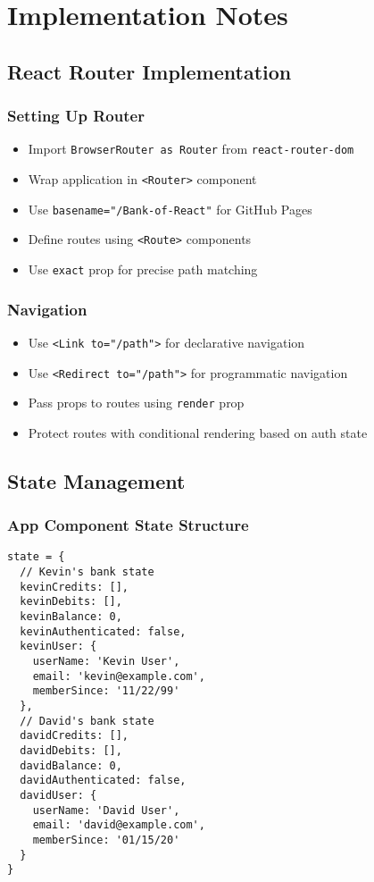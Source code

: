 \documentclass[11pt,a4paper]{article}
\begin{document}
\section{Implementation Notes}

\subsection{React Router Implementation}

\subsubsection{Setting Up Router}
\begin{itemize}[leftmargin=*]
    \item Import \texttt{BrowserRouter as Router} from \texttt{react-router-dom}
    \item Wrap application in \texttt{<Router>} component
    \item Use \texttt{basename="/Bank-of-React"} for GitHub Pages
    \item Define routes using \texttt{<Route>} components
    \item Use \texttt{exact} prop for precise path matching
\end{itemize}

\subsubsection{Navigation}
\begin{itemize}[leftmargin=*]
    \item Use \texttt{<Link to="/path">} for declarative navigation
    \item Use \texttt{<Redirect to="/path">} for programmatic navigation
    \item Pass props to routes using \texttt{render} prop
    \item Protect routes with conditional rendering based on auth state
\end{itemize}

\subsection{State Management}

\subsubsection{App Component State Structure}
\begin{verbatim}
state = {
  // Kevin's bank state
  kevinCredits: [],
  kevinDebits: [],
  kevinBalance: 0,
  kevinAuthenticated: false,
  kevinUser: {
    userName: 'Kevin User',
    email: 'kevin@example.com',
    memberSince: '11/22/99'
  },
  // David's bank state
  davidCredits: [],
  davidDebits: [],
  davidBalance: 0,
  davidAuthenticated: false,
  davidUser: {
    userName: 'David User',
    email: 'david@example.com',
    memberSince: '01/15/20'
  }
}
\end{verbatim}
\end{document}
